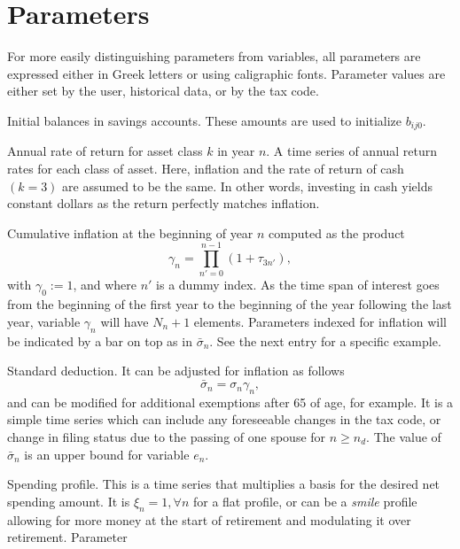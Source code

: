 \documentclass{report}[fleqn,12pt]
\begin{document}
\section{Parameters}
For more easily distinguishing parameters from variables, all parameters are expressed
either in Greek letters or using caligraphic fonts.
Parameter values are either set by the user, historical data, or by the tax code.
\begin{description}[leftmargin=4em,style=multiline]
\item [$\beta_{ij}$]
	Initial balances in savings accounts. These amounts are used to initialize $b_{ij0}$.
\item [$\tau_{kn}$]
	Annual rate of return for asset class $k$ in year $n$.
	A time series of annual return rates for each class of asset.
	Here, inflation and the rate of return of cash $(k=3)$ are assumed to be the same.
	In other words, investing in cash yields constant dollars as the return perfectly
	matches inflation.
\item [$\gamma_n$]
	Cumulative inflation at the beginning of year $n$ computed as the product
	\begin{equation}
		\gamma_n = \prod_{n' = 0}^{n-1} (1 + \tau_{3n'}),
	\end{equation}
	with $\gamma_0 := 1$, and where $n'$ is a dummy index.
	As the time span of interest goes from the beginning of the first year to the beginning
        of the year following the last year, variable $\gamma_n$ will have $N_n + 1$ elements.
	Parameters indexed for inflation will be indicated by a bar on top as in $\bar{\sigma}_n$.
	See the next entry for a specific example.
\item [$\sigma_n$]
	Standard deduction. It can be adjusted for inflation as follows
	\begin{equation}
		\bar\sigma_n = \sigma_n \gamma_n,
	\end{equation}
	and can be modified for additional exemptions after 65 of age, for example.
	It is a simple time series
	which can include any foreseeable changes in the tax code, or change in filing status due to the
	passing of one spouse for $n\ge n_d$.  The value of $\bar{\sigma}_n$ is an upper bound for variable $e_n$.
\item [$\xi_{n}$]
	Spending profile. This is a time series that multiplies a basis for the desired net spending amount.
	It is $\xi_n =1, \forall n$ for
	a flat profile, or can be a {\em smile} profile allowing for more money at the start
	of retirement and modulating it over retirement. Parameter

\end{description}
\end{document}
